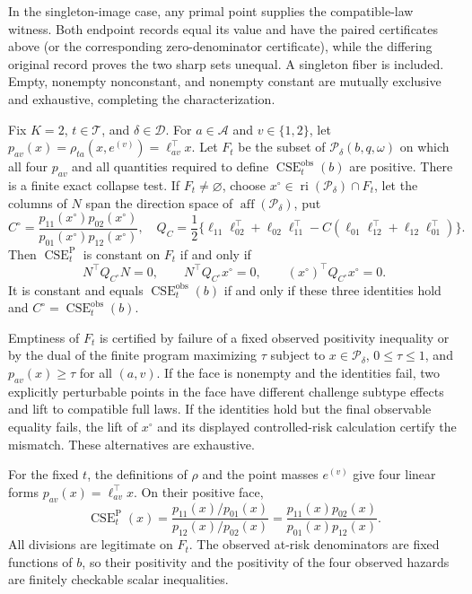 In the singleton-image case, any primal point supplies the compatible-law witness.  Both endpoint records equal its value and have the paired certificates above (or the corresponding zero-denominator certificate), while the differing original record proves the two sharp sets unequal.  A singleton fiber is included.  Empty, nonempty nonconstant, and nonempty constant are mutually exclusive and exhaustive, completing the characterization.

Fix \(K=2\), \(t\in\mathcal T\), and \(\delta\in\mathcal D\).  For \(a\in\mathcal A\) and \(v\in\{1,2\}\), let \(p_{av}(x)=\rho_{ta}(x,e^{(v)})=\ell_{av}^\top x\).  Let \(F_t\) be the subset of \(\mathcal P_\delta(b,q,\omega)\) on which all four \(p_{av}\) and all quantities required to define \(\operatorname{CSE}^{\mathrm{obs}}_t(b)\) are positive.  There is a finite exact collapse test.  If \(F_t\ne\varnothing\), choose \(x^\circ\in\operatorname{ri}(\mathcal P_\delta)\cap F_t\), let the columns of \(N\) span the direction space of \(\operatorname{aff}(\mathcal P_\delta)\), put
\[
C^\circ=\frac{p_{11}(x^\circ)p_{02}(x^\circ)}{p_{01}(x^\circ)p_{12}(x^\circ)},
\quad
Q_C=\frac12\{\ell_{11}\ell_{02}^\top+\ell_{02}\ell_{11}^\top-C(\ell_{01}\ell_{12}^\top+\ell_{12}\ell_{01}^\top)\}.
\]
Then \(\operatorname{CSE}^{\mathrm P}_t\) is constant on \(F_t\) if and only if
\[
N^\top Q_{C^\circ}N=0,\qquad N^\top Q_{C^\circ}x^\circ=0,
\qquad (x^\circ)^\top Q_{C^\circ}x^\circ=0.
\]
It is constant and equals \(\operatorname{CSE}^{\mathrm{obs}}_t(b)\) if and only if these three identities hold and \(C^\circ=\operatorname{CSE}^{\mathrm{obs}}_t(b)\).

Emptiness of \(F_t\) is certified by failure of a fixed observed positivity inequality or by the dual of the finite program maximizing \(\tau\) subject to \(x\in\mathcal P_\delta\), \(0\leq\tau\leq1\), and \(p_{av}(x)\geq\tau\) for all \((a,v)\).  If the face is nonempty and the identities fail, two explicitly perturbable points in the face have different challenge subtype effects and lift to compatible full laws.  If the identities hold but the final observable equality fails, the lift of \(x^\circ\) and its displayed controlled-risk calculation certify the mismatch.  These alternatives are exhaustive.

For the fixed \(t\), the definitions of \(\rho\) and the point masses \(e^{(v)}\) give four linear forms \(p_{av}(x)=\ell_{av}^\top x\).  On their positive face,
\[
\operatorname{CSE}^{\mathrm P}_t(x)
=\frac{p_{11}(x)/p_{01}(x)}{p_{12}(x)/p_{02}(x)}
=\frac{p_{11}(x)p_{02}(x)}{p_{01}(x)p_{12}(x)}.
\]
All divisions are legitimate on \(F_t\).  The observed at-risk denominators are fixed functions of \(b\), so their positivity and the positivity of the four observed hazards are finitely checkable scalar inequalities.

